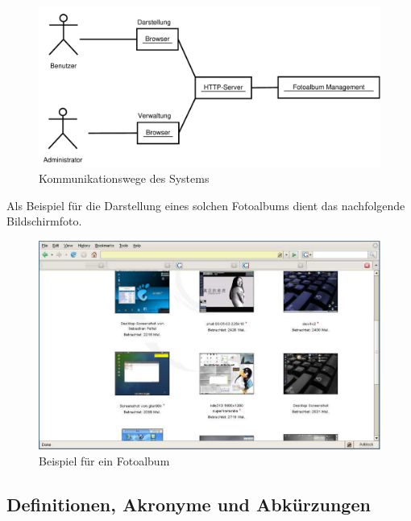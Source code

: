\documentclass[a4paper,12pt,liststotocnumbered]{scrartcl}
\begin{document}
\begin{figure}[bh]
	\begin{center}
		\includegraphics[width=\textwidth*3/4]{ueberblick}
		\caption{Kommunikationswege des Systems}
		\label{overview}
	\end{center}
\end{figure}

\newpage

Als Beispiel für die Darstellung eines solchen Fotoalbums dient das
nachfolgende Bildschirmfoto.

\begin{figure}[bh]
	\begin{center}
		\includegraphics[width=\textwidth]{gallery}
		\caption{Beispiel für ein Fotoalbum}
		\label{sample}
	\end{center}
\end{figure}

\subsection{Definitionen, Akronyme und Abkürzungen}
\end{document}
